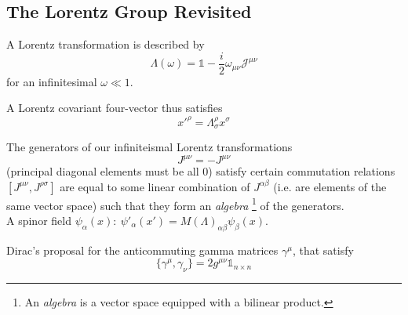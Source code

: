 \documentclass[11pt]{article}
\author{}
\title{}
\date{}
\begin{document}
	
	\pagestyle{fancy}
	\maketitle
	
	\vspace{-8em}
	
	
	\noindent
	
	\vspace{11pt}
	

	\subsection*{The Lorentz Group Revisited}
	
		A Lorentz transformation is described by \[ \Lambda(\omega) = \mathbb{1} - \frac{i}{2}\omega_{\mu\nu} \mathcal{J}^{\mu\nu}\] for an infinitesimal $\omega \ll 1$.
		
		
		A Lorentz covariant four-vector thus satisfies \[ x'^{\rho} = \Lambda^\rho_\sigma x^\sigma\] 
		
		The generators of our infiniteismal Lorentz transformations \[ J^{\mu\nu} = -J^{\mu\nu}\] (principal diagonal elements must be all $0$) satisfy certain commutation relations 
		$[ J^{\mu\nu} , J^{\rho\sigma} ]$ are equal to some linear combination of $J^{\alpha\beta}$ (i.e. are elements of the same vector space) such that they form an \textit{algebra} \footnote{An {\it algebra} is a vector space equipped with a bilinear product.} of the generators.\\ 
	
	
A spinor field $\psi_\alpha(x):\ \psi'_\alpha(x') = M(\Lambda)_{\alpha\beta}\psi_\beta(x)$.


Dirac's proposal for the anticommuting gamma matrices $\gamma^\mu$, that satisfy \[ \{\gamma^\mu, \gamma_\nu\} = 2g^{\mu\nu} \mathbb{1}_{n\times n}\]
\end{document}

